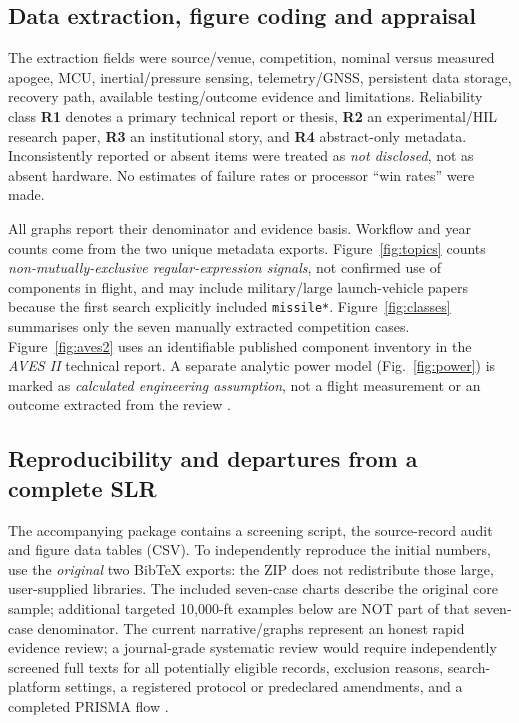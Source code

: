 \documentclass[10pt,a4paper]{article}
\begin{document}
\subsection{Data extraction, figure coding and appraisal}
The extraction fields were source/venue, competition, nominal versus measured apogee, MCU, inertial/pressure sensing, telemetry/GNSS, persistent data storage, recovery path, available testing/outcome evidence and limitations. Reliability class \textbf{R1} denotes a primary technical report or thesis, \textbf{R2} an experimental/HIL research paper, \textbf{R3} an institutional story, and \textbf{R4} abstract-only metadata. Inconsistently reported or absent items were treated as \emph{not disclosed}, not as absent hardware. No estimates of failure rates or processor ``win rates'' were made.

All graphs report their denominator and evidence basis. Workflow and year counts come from the two unique metadata exports. Figure~\ref{fig:topics} counts \emph{non-mutually-exclusive regular-expression signals}, not confirmed use of components in flight, and may include military/large launch-vehicle papers because the first search explicitly included \texttt{missile*}. Figure~\ref{fig:classes} summarises only the seven manually extracted competition cases. Figure~\ref{fig:aves2} uses an identifiable published component inventory in the \emph{AVES II} technical report. A separate analytic power model (Fig.~\ref{fig:power}) is marked as \emph{calculated engineering assumption}, not a flight measurement or an outcome extracted from the review \cite{astg2022aves2,rpicopico,rtc2027rules}.

\subsection{Reproducibility and departures from a complete SLR}
The accompanying package contains a screening script, the source-record audit and figure data tables (CSV). To independently reproduce the initial numbers, use the \emph{original} two BibTeX exports: the ZIP does not redistribute those large, user-supplied libraries. The included seven-case charts describe the original core sample; additional targeted 10,000-ft examples below are NOT part of that seven-case denominator. The current narrative/graphs represent an honest rapid evidence review; a journal-grade systematic review would require independently screened full texts for all potentially eligible records, exclusion reasons, search-platform settings, a registered protocol or predeclared amendments, and a completed PRISMA flow \cite{page2021,rethlefsen2021}.
\end{document}
